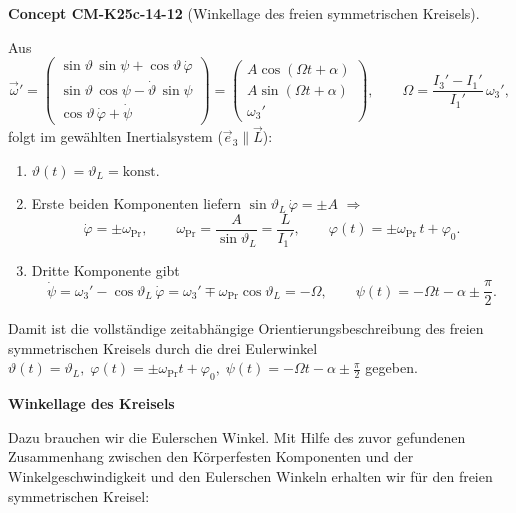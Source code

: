 \documentclass[10pt, letterpaper]{article}
\newcommand{\CustomHeading}[3]{%
  \par\medskip\noindent%
  \textbf{#1 #2} \textnormal{(#3)}.\enskip%
}
\newenvironment{CONC}[2]{\begin{unitbox}\CustomHeading{Concept}{#1}{#2}}{\end{unitbox}}
\begin{document}
\begin{CONC}{CM-K25c-14-12}{Winkellage des freien symmetrischen Kreisels}
Aus
\[
\vec\omega'
=
\begin{pmatrix}
\sin\vartheta\,\sin\psi+\cos\vartheta\,\dot\varphi\\[2pt]
\sin\vartheta\,\cos\psi-\dot\vartheta\,\sin\psi\\[2pt]
\cos\vartheta\,\dot\varphi+\dot\psi
\end{pmatrix}
=
\begin{pmatrix}
A\cos(\Omega t+\alpha)\\
A\sin(\Omega t+\alpha)\\
\omega_3'
\end{pmatrix},
\qquad
\Omega=\frac{I_3'-I_1'}{I_1'}\,\omega_3',
\]
folgt im gewählt­en Inertialsystem ($\vec e_3\parallel\vec L$):

\begin{enumerate}
\item \(\vartheta(t)=\vartheta_L=\text{konst}\).

\item Erste beiden Komponenten liefern  
      \(\sin\vartheta_L\,\dot\varphi=\pm A\)  
      \(\Longrightarrow\)
      \[
        \dot\varphi=\pm\omega_{\text{Pr}}\!,
        \qquad
        \omega_{\text{Pr}}=\frac{A}{\sin\vartheta_L}
                          =\frac{L}{I_1'},
        \qquad
        \varphi(t)=\pm\omega_{\text{Pr}}\,t+\varphi_0 .
      \]

\item Dritte Komponente gibt  
      \[
        \dot\psi
        =\omega_3'-\cos\vartheta_L\,\dot\varphi
        =\omega_3'\mp\omega_{\text{Pr}}\cos\vartheta_L
        =-\Omega,
        \qquad
        \psi(t)=-\Omega t-\alpha\pm\frac{\pi}{2}.
      \]
\end{enumerate}

Damit ist die vollständige zeitabhängige Orientierungsbeschreibung des freien symmetrischen Kreisels durch die drei Eulerwinkel
\(
  \vartheta(t)=\vartheta_L,\;
  \varphi(t)=\pm\omega_{\text{Pr}}t+\varphi_0,\;
  \psi(t)=-\Omega t-\alpha\pm\frac{\pi}{2}
\)
gegeben.
\end{CONC}





\textbf{Winkellage des Kreisels}

Dazu brauchen wir die Eulerschen Winkel. Mit Hilfe des zuvor gefundenen Zusammenhang zwischen den Körperfesten Komponenten und der Winkelgeschwindigkeit und den Eulerschen Winkeln erhalten wir für den freien symmetrischen Kreisel:
\end{document}
